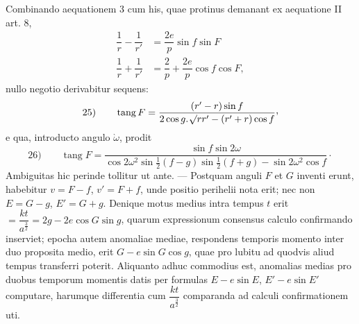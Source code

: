 Combinando aequationem 3 cum his, quae protinus demanant ex aequatione II art. 8,
\[
\begin{aligned}
\dfrac1r-\dfrac1{r'}&=\dfrac{2e}{p}\sin f\sin F\\[6pt]
\dfrac1r+\dfrac1{r'}&=\dfrac2p+\dfrac{2e}{p}\cos f\cos F,
\end{aligned}
\]
nullo negotio derivabitur sequens:
\[
\mathrm{25)}\qquad \operatorname{tang}F=\dfrac{(r'-r)\sin f}{2\cos g\mathpunct{.}\BareRoot{rr'}-(r'+r)\cos f}\mathpunct{\raisebox{.45ex}{,}}
\]
e qua, introducto angulo $\grave{\omega}$, prodit
\[
\mathrm{26)}\qquad \operatorname{tang}F=\dfrac{\sin f\sin 2\omega}{\cos 2\omega^2\sin\frac12(f-g)\sin\frac12(f+g)-\sin 2\omega^2\cos f}\mathpunct{\cdot}
\]
Ambiguitas hic perinde tollitur ut ante. — Postquam anguli $F$ et $G$ inventi erunt, habebitur $v=F-f$, $v'=F+f$, unde positio perihelii nota erit; nec non $E=G-g$, $E'=G+g$. Denique motus medius intra tempus $t$ erit $=\dfrac{kt}{a^{\frac32}}=2g-2e\cos G\sin g$, quarum expressionum consensus calculo confirmando inserviet; epocha autem anomaliae mediae, respondens temporis momento inter duo proposita medio, erit $G-e\sin G\cos g$, quae pro lubitu ad quodvis aliud tempus transferri poterit. Aliquanto adhuc commodius est, anomalias medias pro duobus temporum momentis datis per formulas $E-e\sin E$, $E'-e\sin E'$ computare, harumque differentia cum $\dfrac{kt}{a^{\frac32}}$ comparanda ad calculi confirmationem uti.
